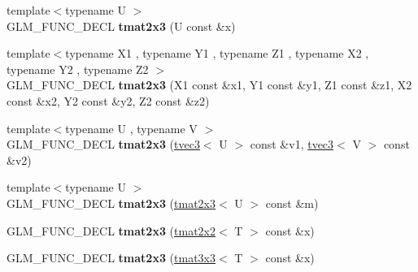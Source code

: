 \begin{DoxyCompactItemize}
\item 
\hypertarget{structglm_1_1detail_1_1tmat2x3_ad5c1b77b2c1b21348f3fc31b9efd62b5}{{\footnotesize template$<$typename U $>$ }\\G\-L\-M\-\_\-\-F\-U\-N\-C\-\_\-\-D\-E\-C\-L {\bfseries tmat2x3} (U const \&x)}\label{structglm_1_1detail_1_1tmat2x3_ad5c1b77b2c1b21348f3fc31b9efd62b5}

\item 
\hypertarget{structglm_1_1detail_1_1tmat2x3_a474ba9a15b1b4b89caacf6171cecb7d6}{{\footnotesize template$<$typename X1 , typename Y1 , typename Z1 , typename X2 , typename Y2 , typename Z2 $>$ }\\G\-L\-M\-\_\-\-F\-U\-N\-C\-\_\-\-D\-E\-C\-L {\bfseries tmat2x3} (X1 const \&x1, Y1 const \&y1, Z1 const \&z1, X2 const \&x2, Y2 const \&y2, Z2 const \&z2)}\label{structglm_1_1detail_1_1tmat2x3_a474ba9a15b1b4b89caacf6171cecb7d6}

\item 
\hypertarget{structglm_1_1detail_1_1tmat2x3_adf8f24014d50e180f069b45470fd3efd}{{\footnotesize template$<$typename U , typename V $>$ }\\G\-L\-M\-\_\-\-F\-U\-N\-C\-\_\-\-D\-E\-C\-L {\bfseries tmat2x3} (\hyperlink{structglm_1_1detail_1_1tvec3}{tvec3}$<$ U $>$ const \&v1, \hyperlink{structglm_1_1detail_1_1tvec3}{tvec3}$<$ V $>$ const \&v2)}\label{structglm_1_1detail_1_1tmat2x3_adf8f24014d50e180f069b45470fd3efd}

\item 
\hypertarget{structglm_1_1detail_1_1tmat2x3_a5f81a32da21791aeb89913e58450beec}{{\footnotesize template$<$typename U $>$ }\\G\-L\-M\-\_\-\-F\-U\-N\-C\-\_\-\-D\-E\-C\-L {\bfseries tmat2x3} (\hyperlink{structglm_1_1detail_1_1tmat2x3}{tmat2x3}$<$ U $>$ const \&m)}\label{structglm_1_1detail_1_1tmat2x3_a5f81a32da21791aeb89913e58450beec}

\item 
\hypertarget{structglm_1_1detail_1_1tmat2x3_a4c1b720d52e5b9a9355c20d68cc9d931}{G\-L\-M\-\_\-\-F\-U\-N\-C\-\_\-\-D\-E\-C\-L {\bfseries tmat2x3} (\hyperlink{structglm_1_1detail_1_1tmat2x2}{tmat2x2}$<$ T $>$ const \&x)}\label{structglm_1_1detail_1_1tmat2x3_a4c1b720d52e5b9a9355c20d68cc9d931}

\item 
\hypertarget{structglm_1_1detail_1_1tmat2x3_ad522db54d8643b0b16ba78b0ccf487eb}{G\-L\-M\-\_\-\-F\-U\-N\-C\-\_\-\-D\-E\-C\-L {\bfseries tmat2x3} (\hyperlink{structglm_1_1detail_1_1tmat3x3}{tmat3x3}$<$ T $>$ const \&x)}\label{structglm_1_1detail_1_1tmat2x3_ad522db54d8643b0b16ba78b0ccf487eb}


\end{DoxyCompactItemize}
